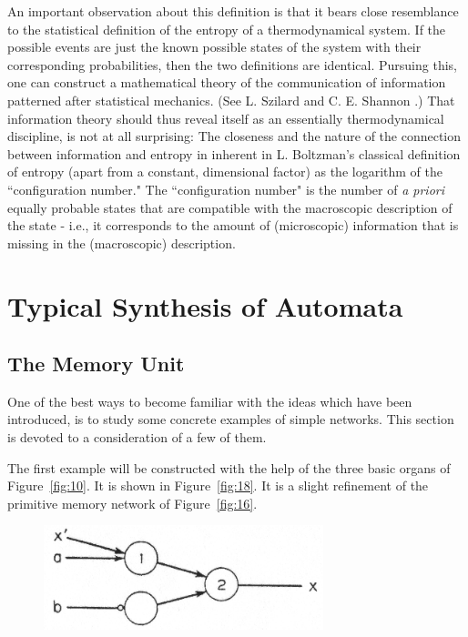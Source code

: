 \documentclass[twocolumn,preprintnumbers,amsmath,amssymb,floatfix]{revtex4}
\begin{document}
An important observation about this definition is that it bears
close resemblance to the statistical definition of the entropy of
a thermodynamical system. If the possible events are just the
known possible states of the system with their corresponding
probabilities, then the two definitions are identical. Pursuing
this, one can construct a mathematical theory of the communication
of information patterned after statistical mechanics. (See L.
Szilard \cite{Szilard29} and C. E. Shannon \cite{Shannon48}.) That
information theory should thus reveal itself as an essentially
thermodynamical discipline, is not at all surprising: The
closeness and the nature of the connection between information and
entropy in inherent in L. Boltzman's classical definition of
entropy (apart from a constant, dimensional factor) as the
logarithm of the ``configuration number." The ``configuration
number" is the number of \textit{a priori} equally probable states
that are compatible with the macroscopic description of the state
- i.e., it corresponds to the amount of (microscopic) information
that is missing in the (macroscopic) description.

\section{\label{sec:six}Typical Synthesis of Automata}

\subsection{\label{sec:six1}The Memory Unit}

One of the best ways to become familiar with the ideas which have
been introduced, is to study some concrete examples of simple
networks. This section is devoted to a consideration of a few of
them.

The first example will be constructed with the help of the three
basic organs of Figure~\ref{fig:10}. It is shown in
Figure~\ref{fig:18}. It is a slight refinement of the primitive
memory network of Figure~\ref{fig:16}.

\begin{figure}
\includegraphics[width=3.2in]{fig_17}
\caption{\label{fig:17}}
\end{figure}
\end{document}

